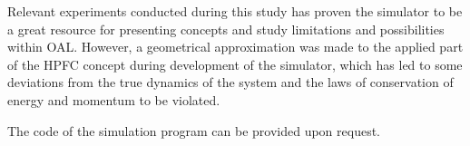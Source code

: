 Relevant experiments conducted during this study has proven the simulator to be a great resource for presenting concepts and study limitations and possibilities within OAL. However, a geometrical approximation was made to the applied part of the HPFC concept during development of the simulator, which has led to some deviations from the true dynamics of the system and the laws of conservation of energy and momentum to be violated.

The code of the simulation program can be provided upon request.


\makeatletter
{}


\makeatother







